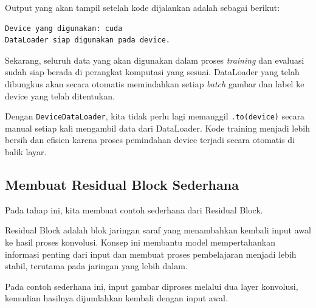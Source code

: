 Output yang akan tampil setelah kode dijalankan adalah sebagai berikut:

\begin{outputcode}[H]
\begin{lstlisting}[language={}]
Device yang digunakan: cuda
DataLoader siap digunakan pada device.
\end{lstlisting}
\caption{Output pemindahan DataLoader ke device}
\end{outputcode}

Sekarang, seluruh data yang akan digunakan dalam proses \textit{training} dan evaluasi sudah siap berada di perangkat komputasi yang sesuai. DataLoader yang telah dibungkus akan secara otomatis memindahkan setiap \textit{batch} gambar dan label ke device yang telah ditentukan.

Dengan \texttt{DeviceDataLoader}, kita tidak perlu lagi memanggil \texttt{.to(device)} secara manual setiap kali mengambil data dari DataLoader. Kode training menjadi lebih bersih dan efisien karena proses pemindahan device terjadi secara otomatis di balik layar.

\subsection{Membuat Residual Block Sederhana}

Pada tahap ini, kita membuat contoh sederhana dari Residual Block.

Residual Block adalah blok jaringan saraf yang menambahkan kembali input awal ke hasil proses konvolusi. Konsep ini membantu model mempertahankan informasi penting dari input dan membuat proses pembelajaran menjadi lebih stabil, terutama pada jaringan yang lebih dalam.

Pada contoh sederhana ini, input gambar diproses melalui dua layer konvolusi, kemudian hasilnya dijumlahkan kembali dengan input awal.

